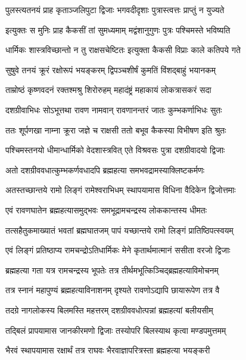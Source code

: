 \twolineshloka
{पुलस्त्यतनयं प्राह कृताञ्जलिपुटा द्विजाः}
{भगवदीदृशाः पुत्रास्त्वत्तः प्राप्तुं न युज्यते}%

\twolineshloka
{इत्युक्तः स मुनिः प्राह कैकसीं तां सुमध्यमाम्}
{मद्वंशानुगुणः पुत्रः पश्चिमस्ते भविष्यति}%

\twolineshloka
{धार्मिकः शास्त्रविच्छान्तो न तु राक्षसचेष्टितः}
{इत्युक्ता कैकसी विप्राः काले कतिपये गते}%

\twolineshloka
{सुषुवे तनयं क्रूरं रक्षोरूपं भयङ्करम्}
{द्विपञ्चशीर्षं कुमतिं विंशद्बाहुं भयानकम्}%

\twolineshloka
{ताम्रोष्ठं कृष्णवदनं रक्तश्मश्रु शिरोरुहम्}
{महादंष्ट्रं महाकायं लोकत्रासकरं सदा}%

\twolineshloka
{दशग्रीवाभिधः सोऽभूत्तथा रावण नामवान्}
{रावणानन्तरं जातः कुम्भकर्णाभिधः सुतः}%

\twolineshloka
{ततः शूर्पणखा नाम्ना क्रूरा जज्ञे च राक्षसी}
{ततो बभूव कैकस्या विभीषण इति श्रुतः}%

\twolineshloka
{पश्चिमस्तनयो धीमान्धार्मिको वेदशास्त्रवित्}
{एते विश्रवसः पुत्रा दशग्रीवादयो द्विजाः}%

\twolineshloka
{अतो दशग्रीववधात्कुम्भकर्णवधादपि}
{ब्रह्महत्या समभवद्रामस्याक्लिष्टकर्मणः}%

\twolineshloka
{अतस्तच्छान्तये रामो लिङ्गं रामेश्वराभिधम्}
{स्थापयामास विधिना वैदिकेन द्विजोत्तमाः}%

\twolineshloka
{एवं रावणघातेन ब्रह्महत्यासमुद्भवः}
{समभूद्रामचन्द्रस्य लोककान्तस्य धीमतः}%

\twolineshloka
{तत्सहैतुकमाख्यातं भवतां ब्रह्मघातजम्}
{पापं यच्छान्तये रामो लिङ्गं प्रातिष्ठिपत्स्वयम्}%

\twolineshloka
{एवं लिङ्गं प्रतिष्ठाप्य रामचन्द्रोऽतिधार्मिकः}
{मेने कृतार्थमात्मानं ससीता वरजो द्विजाः}%

\twolineshloka
{ब्रह्महत्या गता यत्र रामचन्द्रस्य भूपतेः}
{तत्र तीर्थमभूत्किञ्चिद्ब्रह्महत्याविमोचनम्}%

\twolineshloka
{तत्र स्नानं महापुण्यं ब्रह्महत्याविनाशनम्}
{दृश्यते रावणोऽद्यापि छायारूपेण तत्र वै}%

\twolineshloka
{तदग्रे नागलोकस्य बिलमस्ति महत्तरम्}
{दशग्रीववधोत्पन्नां ब्रह्महत्यां बलीयसीम्}%

\twolineshloka
{तद्बिलं प्रापयामास जानकीरमणो द्विजाः}
{तस्योपरि बिलस्याथ कृत्वा मण्डपमुत्तमम्}%

\twolineshloka
{भैरवं स्थापयामास रक्षार्थं तत्र राघवः}
{भैरवाज्ञापरित्रस्ता ब्रह्महत्या भयङ्करी}%

